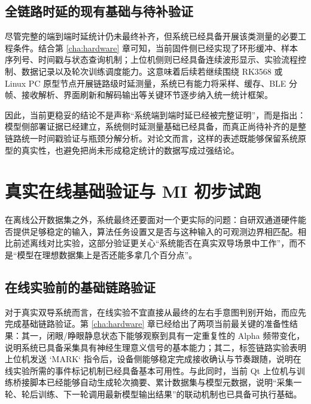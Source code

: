 \subsection{全链路时延的现有基础与待补验证}

尽管完整的端到端时延统计仍未最终补齐，但系统已经具备开展该类测量的必要工程条件。结合第 \ref{cha:hardware} 章可知，当前固件侧已经实现了环形缓冲、样本序列号、时间戳与状态查询机制；上位机侧则已经具备连续波形显示、实验流程控制、数据记录以及轮次训练调度能力。这意味着后续若继续围绕 RK3568 或 Linux PC 原型节点开展链路级时延测量，系统已有能力将采样、缓存、BLE 分帧、接收解析、界面刷新和解码输出等关键环节逐步纳入统一统计框架。

因此，当前更稳妥的结论不是声称“系统端到端时延已经被完整证明”，而是指出：模型侧部署证据已经建立，系统侧时延测量基础已经具备，而真正尚待补齐的是整链路统一时间戳验证与瓶颈分解分析。对论文而言，这样的表述既能够保留系统原型的真实性，也避免把尚未形成稳定统计的数据写成过强结论。

\section{真实在线基础验证与 MI 初步试跑}

在离线公开数据集之外，系统最终还要面对一个更实际的问题：自研双通道硬件能否提供足够稳定的输入，算法任务设置又是否与这种输入的可观测边界相匹配。相比前述离线对比实验，这部分验证更关心“系统能否在真实双导场景中工作”，而不是“模型在理想数据集上是否还能多拿几个百分点”。

\subsection{在线实验前的基础链路验证}

对于真实双导系统而言，在线实验不宜直接从最终的左右手意图判别开始，而应先完成基础链路验证。第 \ref{cha:hardware} 章已经给出了两项当前最关键的准备性结果：其一，闭眼/睁眼静息状态下能够观察到具有一定重复性的 Alpha 频带变化，说明系统已具备采集具有神经生理意义信号的基本能力；其二，标签链路实验表明上位机发送 `MARK` 指令后，设备侧能够稳定完成接收确认与节奏跟随，说明在线实验所需的事件标记机制已经具备基本可用性。与此同时，当前 Qt 上位机与训练桥接脚本已经能够自动生成轮次摘要、累计数据集与模型元数据，说明“采集一轮、轮后训练、下一轮调用最新模型输出结果”的联动机制也已具备可执行基础。

